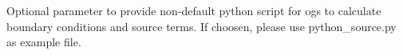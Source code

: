 Optional parameter to provide non-\/default python script for ogs to calculate boundary conditions and source terms. If choosen, please use python\+\_\+source.\+py as example file. 
